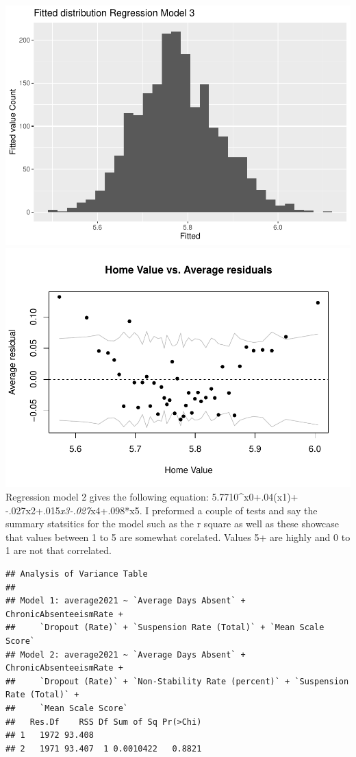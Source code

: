 \documentclass[
]{article}
\begin{document}
\includegraphics{final-writeup_files/figure-latex/unnamed-chunk-6-5.pdf}
\includegraphics{final-writeup_files/figure-latex/unnamed-chunk-6-6.pdf}
Regression model 2 gives the following equation: 5.7710\^{}x0+.04(x1)+
-.027x2+.015\emph{x3-.027}x4+.098*x5. I preformed a couple of tests and
say the summary statsitics for the model such as the r square as well as
these showcase that values between 1 to 5 are somewhat corelated. Values
5+ are highly and 0 to 1 are not that correlated.

\begin{verbatim}
## Analysis of Variance Table
## 
## Model 1: average2021 ~ `Average Days Absent` + ChronicAbsenteeismRate + 
##     `Dropout (Rate)` + `Suspension Rate (Total)` + `Mean Scale Score`
## Model 2: average2021 ~ `Average Days Absent` + ChronicAbsenteeismRate + 
##     `Dropout (Rate)` + `Non-Stability Rate (percent)` + `Suspension Rate (Total)` + 
##     `Mean Scale Score`
##   Res.Df    RSS Df Sum of Sq Pr(>Chi)
## 1   1972 93.408                      
## 2   1971 93.407  1 0.0010422   0.8821
\end{verbatim}
\end{document}

